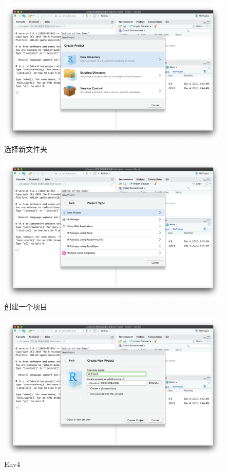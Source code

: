 \documentclass[]{scrbook}
\begin{document}
\begin{figure}
\centering
\includegraphics{Fig/ch1/Env2.png}
\caption{选择新文件夹}
\end{figure}

\begin{figure}
\centering
\includegraphics{Fig/ch1/Env3.png}
\caption{创建一个项目}
\end{figure}

\begin{figure}
\centering
\includegraphics{Fig/ch1/Env4.png}
\caption{Env4}
\end{figure}
\end{document}
